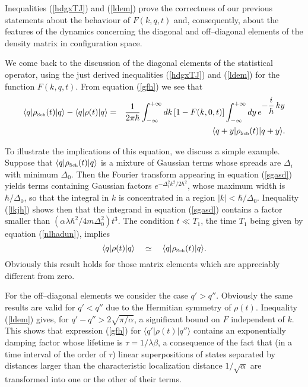 \documentclass[12pt]{article}
\begin{document}
Inequalities (\ref{hdgxTJ}) and (\ref{ldem}) prove the correctness
of our previous statements about the behaviour of $F(k,q,t)$ and,
consequently, about the features of the dynamics concerning the
diagonal and off--diagonal elements of the density matrix in
configuration space.

We come back to the discussion of the diagonal elements of the
statistical operator, using the just derived inequalities
(\ref{hdgxTJ}) and (\ref{ldem}) for the function $F(k,q,t)$. From
equation (\ref{gfh}) we see that
\begin{eqnarray} \label{sgasd}
\langle q| \rho_{\makebox{\tiny Sch}}(t)| q\rangle - \langle q|
\rho(t)| q\rangle & = & \frac{1}{2\pi\hbar}
\int_{-\infty}^{+\infty} dk\, [1-F(k,0,t)]
\int_{-\infty}^{+\infty} dy\, e^{\displaystyle -\frac{i}{\hbar} \,
ky} \nonumber \\ & & \langle q+y|\rho_{\makebox{\tiny Sch}}(t)|
q+y\rangle.
\end{eqnarray}

To illustrate the implications of this equation, we discuss a
simple example. Suppose that $\langle q| \rho_{\makebox{\tiny
Sch}}(t)| q\rangle$ is a mixture of Gaussian terms whose spreads
are $\Delta_{i}$ with minimum $\Delta_{0}$. Then the Fourier
transform appearing in equation (\ref{sgasd}) yields terms
containing Gaussian factors $e^{-\Delta_{i}^{2}k^{2}/2\hbar^{2}}$,
whose maximum width is $\hbar/\Delta_{0}$, so that the integral in
$k$ is concentrated in a region $|k| < \hbar/\Delta_{0}$.
Inequality (\ref{lkjh}) shows then that the integrand in equation
(\ref{sgasd}) contains a factor smaller than
$(\alpha\lambda\hbar^{2}/4m\Delta_{0}^{2}) t^{3}$. The condition
$t \ll T_{1}$, the time $T_{1}$ being given by equation
(\ref{nlhadun}), implies
\begin{equation}
\langle q| \rho(t)| q\rangle \quad \simeq \quad \langle q|
\rho_{\makebox{\tiny Sch}}(t)| q\rangle.
\end{equation}
Obviously this result holds for those matrix elements which are
appreciably different from zero.

For the off--diagonal elements we consider the case $q' > q''$.
Obviously the same results are valid for $q' < q''$ due to the
Hermitian symmetry of $\rho(t)$. Inequality (\ref{ldem}) gives,
for $q' - q'' > 2\sqrt{\pi/\alpha}$, a significant bound on $F$
independent of $k$. This shows that expression (\ref{gfh}) for
$\langle q'|\rho(t)| q''\rangle$ contains an exponentially damping
factor whose lifetime is $\tau  = 1/\lambda\beta$, a consequence
of the fact that (in a time interval of the order of $\tau$)
linear superpositions of states separated by distances larger than
the characteristic localization distance $1/\sqrt{\alpha}$ are
transformed into one or the other of their terms.
\end{document}
